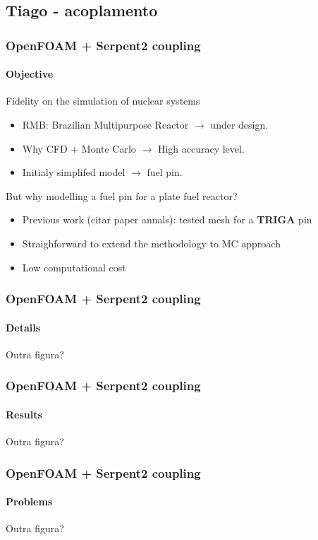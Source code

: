 \documentclass[svgnames,smaller,table]{beamer}
\begin{document}
\subsection{Tiago - acoplamento}
\begin{frame}
  \frametitle{OpenFOAM + Serpent2 coupling}
  \framesubtitle{Objective}
  \begin{center}
    Fidelity on the simulation of nuclear systems\\
    \vspace{10px}
    \begin{itemize}
    \item RMB: Brazilian Multipurpose Reactor $\rightarrow$ under design.
    \item Why CFD + Monte Carlo $\rightarrow$ High accuracy level.
    \item Initialy simplifed model $\rightarrow$ fuel pin.
    \end{itemize}
    But why modelling a fuel pin for a plate fuel reactor?
    \begin{itemize}
    \item Previous work (citar paper annals): tested mesh for a \textbf{TRIGA} pin
    \item Straighforward to extend the methodology to MC approach
    \item Low computational cost
    \end{itemize}
  \end{center}
\end{frame}

\begin{frame}
  \frametitle{OpenFOAM + Serpent2 coupling}
  \framesubtitle{Details}
  \begin{center}
    Outra figura?
  \end{center}
\end{frame}

\begin{frame}
  \frametitle{OpenFOAM + Serpent2 coupling}
  \framesubtitle{Results}
  \begin{center}
    Outra figura?
  \end{center}
\end{frame}

\begin{frame}
  \frametitle{OpenFOAM + Serpent2 coupling}
  \framesubtitle{Problems}
  \begin{center}
    Outra figura?
  \end{center}
\end{frame}
\end{document}
